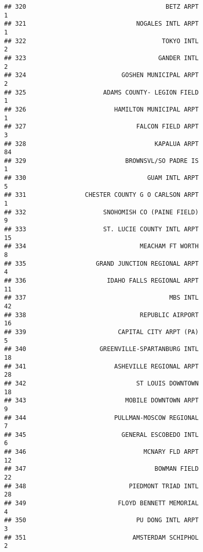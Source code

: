 \documentclass[
]{article}
\begin{document}
\begin{verbatim}
## 320                                      BETZ ARPT                           1
## 321                              NOGALES INTL ARPT                           1
## 322                                     TOKYO INTL                           2
## 323                                    GANDER INTL                           2
## 324                          GOSHEN MUNICIPAL ARPT                           2
## 325                     ADAMS COUNTY- LEGION FIELD                           1
## 326                        HAMILTON MUNICIPAL ARPT                           1
## 327                              FALCON FIELD ARPT                           3
## 328                                   KAPALUA ARPT                          84
## 329                           BROWNSVL/SO PADRE IS                           1
## 330                                 GUAM INTL ARPT                           5
## 331                CHESTER COUNTY G O CARLSON ARPT                           1
## 332                     SNOHOMISH CO (PAINE FIELD)                           9
## 333                     ST. LUCIE COUNTY INTL ARPT                          15
## 334                               MEACHAM FT WORTH                           8
## 335                   GRAND JUNCTION REGIONAL ARPT                           4
## 336                      IDAHO FALLS REGIONAL ARPT                          11
## 337                                       MBS INTL                          42
## 338                               REPUBLIC AIRPORT                          16
## 339                         CAPITAL CITY ARPT (PA)                           5
## 340                    GREENVILLE-SPARTANBURG INTL                          18
## 341                        ASHEVILLE REGIONAL ARPT                          28
## 342                              ST LOUIS DOWNTOWN                          18
## 343                           MOBILE DOWNTOWN ARPT                           9
## 344                        PULLMAN-MOSCOW REGIONAL                           7
## 345                          GENERAL ESCOBEDO INTL                           6
## 346                                MCNARY FLD ARPT                          12
## 347                                   BOWMAN FIELD                          22
## 348                            PIEDMONT TRIAD INTL                          28
## 349                         FLOYD BENNETT MEMORIAL                           4
## 350                              PU DONG INTL ARPT                           3
## 351                             AMSTERDAM SCHIPHOL                           2

\end{verbatim}
\end{document}
